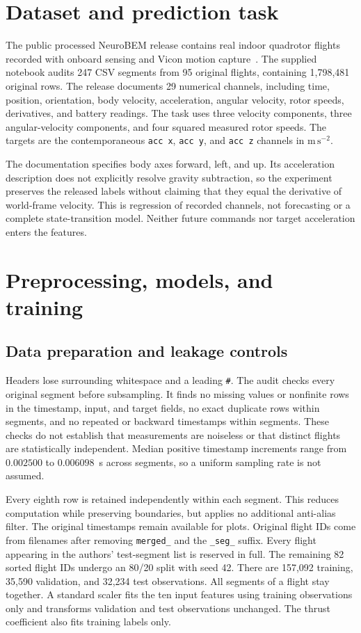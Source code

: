 \documentclass[10pt,letterpaper]{article}
\newcommand{\unit}{\ensuremath{\mathrm{m\,s^{-2}}}}
\begin{document}
\section{Dataset and prediction task}
The public processed NeuroBEM release contains real indoor quadrotor flights recorded with onboard sensing and Vicon motion capture~\cite{neurobemdata}. The supplied notebook audits 247 CSV segments from 95 original flights, containing 1,798,481 original rows. The release documents 29 numerical channels, including time, position, orientation, body velocity, acceleration, angular velocity, rotor speeds, derivatives, and battery readings. The task uses three velocity components, three angular-velocity components, and four squared measured rotor speeds. The targets are the contemporaneous \texttt{acc x}, \texttt{acc y}, and \texttt{acc z} channels in \unit.

The documentation specifies body axes forward, left, and up. Its acceleration description does not explicitly resolve gravity subtraction, so the experiment preserves the released labels without claiming that they equal the derivative of world-frame velocity. This is regression of recorded channels, not forecasting or a complete state-transition model. Neither future commands nor target acceleration enters the features.

\clearpage
\section{Preprocessing, models, and training}
\subsection{Data preparation and leakage controls}
Headers lose surrounding whitespace and a leading \texttt{\#}. The audit checks every original segment before subsampling. It finds no missing values or nonfinite rows in the timestamp, input, and target fields, no exact duplicate rows within segments, and no repeated or backward timestamps within segments. These checks do not establish that measurements are noiseless or that distinct flights are statistically independent. Median positive timestamp increments range from $0.002500$ to $0.006098$~s across segments, so a uniform sampling rate is not assumed.

Every eighth row is retained independently within each segment. This reduces computation while preserving boundaries, but applies no additional anti-alias filter. The original timestamps remain available for plots. Original flight IDs come from filenames after removing \texttt{merged\_} and the \texttt{\_seg\_} suffix. Every flight appearing in the authors' test-segment list is reserved in full. The remaining 82 sorted flight IDs undergo an 80/20 split with seed 42. There are 157,092 training, 35,590 validation, and 32,234 test observations. All segments of a flight stay together. A standard scaler fits the ten input features using training observations only and transforms validation and test observations unchanged. The thrust coefficient also fits training labels only.
\end{document}
